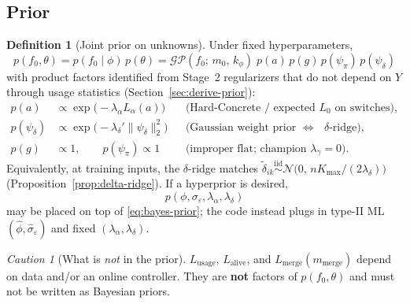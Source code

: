\documentclass[11pt,a4paper]{article}
\theoremstyle{plain}
\theoremstyle{definition}
\newtheorem{definition}[theorem]{Definition}
\theoremstyle{remark}
\newtheorem{caution}[theorem]{Caution}
\newcommand{\Ncal}{\mathcal{N}}
\newcommand{\GP}{\mathcal{GP}}
\newcommand{\tht}{\theta}
\newcommand{\Kmax}{K_{\max}}
\begin{document}
\subsection{Prior}
\begin{definition}[Joint prior on unknowns]
\label{def:bayes-prior}
Under fixed hyperparameters,
\begin{equation}
  \boxed{
  p(f_0,\tht)
  =
  p(f_0\mid\phi)\,p(\tht)
  =
  \GP(f_0;\,m_0,\,k_\phi)
  \;
  p(a)\,p(g)\,p(\psi_\pi)\,p(\psi_\delta)
  }
  \label{eq:bayes-prior}
\end{equation}
with product factors identified from Stage~2 regularizers that do not depend on \(Y\)
through usage statistics (Section~\ref{sec:derive-prior}):
\begin{align}
  p(a)
  &\propto
  \exp\!\bigl(-\lambda_\alpha L_\alpha(a)\bigr)
  &&
  \text{(Hard-Concrete / expected \(L_0\) on switches)},
  \label{eq:bayes-pa}
  \\
  p(\psi_\delta)
  &\propto
  \exp\!\bigl(-\lambda_\delta'\|\psi_\delta\|_2^2\bigr)
  &&
  \text{(Gaussian weight prior \(\Leftrightarrow\) \(\delta\)-ridge)},
  \label{eq:bayes-pdelta}
  \\
  p(g)
  &\propto
  1,
  \qquad
  p(\psi_\pi)\propto 1
  &&
  \text{(improper flat; champion \(\lambda_\gamma=0\))}.
  \label{eq:bayes-flat}
\end{align}
Equivalently, at training inputs, the \(\delta\)-ridge matches
\(\tilde\delta_{ik}\stackrel{\mathrm{iid}}{\sim}\Ncal\bigl(0,\,n\Kmax/(2\lambda_\delta)\bigr)\)
(Proposition~\ref{prop:delta-ridge}).
If a hyperprior is desired,
\[
  p(\phi,\sigma_\varepsilon,\lambda_\alpha,\lambda_\delta)
\]
may be placed on top of \eqref{eq:bayes-prior}; the code instead plugs in type-II ML
\((\hat\phi,\hat\sigma_\varepsilon)\) and fixed \((\lambda_\alpha,\lambda_\delta)\).
\end{definition}

\begin{caution}[What is \emph{not} in the prior]
\(L_{\mathrm{usage}}\), \(L_{\mathrm{alive}}\), and
\(L_{\mathrm{merge}}(m_{\mathrm{merge}})\) depend on data and/or an online controller.
They are \textbf{not} factors of \(p(f_0,\tht)\) and must not be written as Bayesian
priors.
\end{caution}
\end{document}
